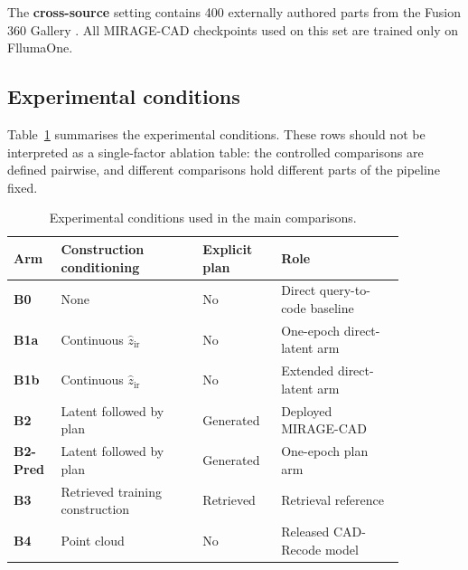 \documentclass[preprint,12pt]{elsarticle}
\begin{document}
The \textbf{cross-source} setting contains 400 externally authored parts from
the Fusion 360 Gallery
\cite{willis2021fusion360gallery}. All MIRAGE-CAD checkpoints used on this set
are trained only on FllumaOne.


\subsection{Experimental conditions}
\label{sec:baselines}

Table~\ref{tab:configurations} summarises the experimental conditions. These
rows should not be interpreted as a single-factor ablation table: the
controlled comparisons are defined pairwise, and different comparisons hold
different parts of the pipeline fixed.

\begin{table}[htbp]
  \centering
  \footnotesize
  \caption{Experimental conditions used in the main comparisons.}
  \label{tab:configurations}

  \begin{tabular}{
      >{\raggedright\arraybackslash}p{0.08\linewidth}
      >{\raggedright\arraybackslash}p{0.32\linewidth}
      >{\raggedright\arraybackslash}p{0.17\linewidth}
      >{\raggedright\arraybackslash}p{0.29\linewidth}
    }
    \toprule
    Arm
     & Construction conditioning
     & Explicit plan
     & Role                               \\
    \midrule

    \textbf{B0}
     & None
     & No
     & Direct query-to-code baseline      \\

    \textbf{B1a}
     & Continuous $\hat{z}_{\mathrm{ir}}$
     & No
     & One-epoch direct-latent arm        \\

    \textbf{B1b}
     & Continuous $\hat{z}_{\mathrm{ir}}$
     & No
     & Extended direct-latent arm         \\

    \textbf{B2}
     & Latent followed by plan
     & Generated
     & Deployed MIRAGE-CAD                \\

    \textbf{B2-Pred}
     & Latent followed by plan
     & Generated
     & One-epoch plan arm                 \\

    \textbf{B3}
     & Retrieved training construction
     & Retrieved
     & Retrieval reference                \\

    \textbf{B4}
     & Point cloud
     & No
     & Released CAD-Recode model          \\
    \bottomrule
  \end{tabular}
\end{table}
\end{document}
